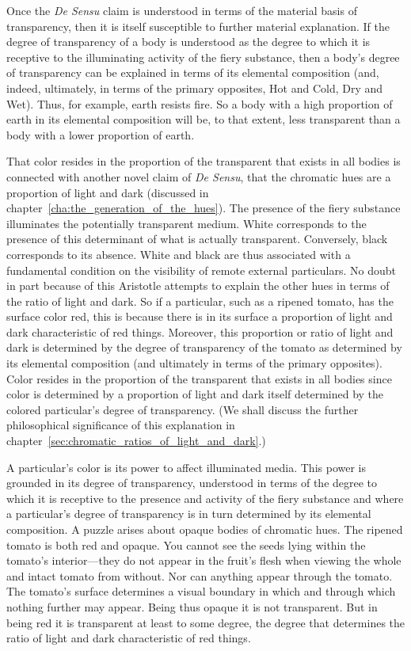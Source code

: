 Once the \emph{De Sensu} claim is understood in terms of the material basis of transparency, then it is itself susceptible to further material explanation. If the degree of transparency of a body is understood as the degree to which it is receptive to the illuminating activity of the fiery substance, then a body's degree of transparency can be explained in terms of its elemental composition (and, indeed, ultimately, in terms of the primary opposites, Hot and Cold, Dry and Wet). Thus, for example, earth resists fire. So a body with a high proportion of earth in its elemental composition will be, to that extent, less transparent than a body with a lower proportion of earth.

That color resides in the proportion of the transparent that exists in all bodies is connected with another novel claim of \emph{De Sensu}, that the chromatic hues are a proportion of light and dark (discussed in chapter~\ref{cha:the_generation_of_the_hues}). The presence of the fiery substance illuminates the potentially transparent me\-di\-um. White corresponds to the presence of this determinant of what is actually transparent. Conversely, black corresponds to its absence. White and black are thus associated with a fundamental condition on the visibility of remote external particulars. No doubt in part because of this Aristotle attempts to explain the other hues in terms of the ratio of light and dark. So if a particular, such as a ripened tomato, has the surface color red, this is because there is in its surface a proportion of light and dark characteristic of red things. Moreover, this proportion or ratio of light and dark is determined by the degree of transparency of the tomato as determined by its elemental composition (and ultimately in terms of the primary opposites). Color resides in the proportion of the transparent that exists in all bodies since color is determined by a proportion of light and dark itself determined by the colored particular's degree of transparency. (We shall discuss the further philosophical significance of this explanation in chapter~\ref{sec:chromatic_ratios_of_light_and_dark}.)

A particular's color is its power to affect illuminated media. This power is grounded in its degree of transparency, understood in terms of the degree to which it is receptive to the presence and activity of the fiery substance and where a particular's degree of transparency is in turn determined by its elemental composition. A puzzle arises about opaque bodies of chromatic hues. The ripened tomato is both red and opaque. You cannot see the seeds lying within the tomato's interior---they do not appear in the fruit's flesh when viewing the whole and intact tomato from without. Nor can anything appear through the tomato. The tomato's surface determines a visual boundary in which and through which nothing further may appear. Being thus opaque it is not transparent. But in being red it is transparent at least to some degree, the degree that determines the ratio of light and dark characteristic of red things.


